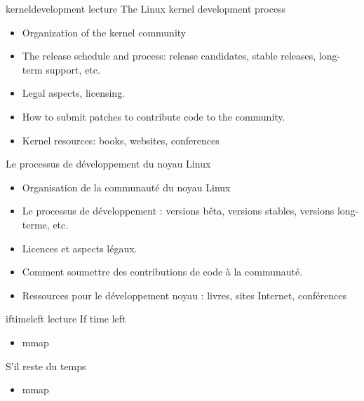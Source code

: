{kerneldevelopment}
{lecture}
{The Linux kernel development process}
{
  \begin{itemize}
  \item Organization of the kernel community
  \item The release schedule and process: release candidates, stable
    releases, long-term support, etc.
  \item Legal aspects, licensing.
  \item How to submit patches to contribute code to the community.
  \item Kernel resources: books, websites, conferences
  \end{itemize}
}
{Le processus de développement du noyau Linux}
{
  \begin{itemize}
  \item Organisation de la communauté du noyau Linux
  \item Le processus de développement : versions bêta, versions stables,
    versions long-terme, etc.
  \item Licences et aspects légaux.
  \item Comment soumettre des contributions de code à la communauté.
  \item Ressources pour le développement noyau : livres, sites Internet, conférences
  \end{itemize}
}
{iftimeleft}
{lecture}
{If time left}
{
  \begin{itemize}
  \item mmap
  \end{itemize}
}
{S'il reste du temps}
{
  \begin{itemize}
  \item mmap
  \end{itemize}
}

